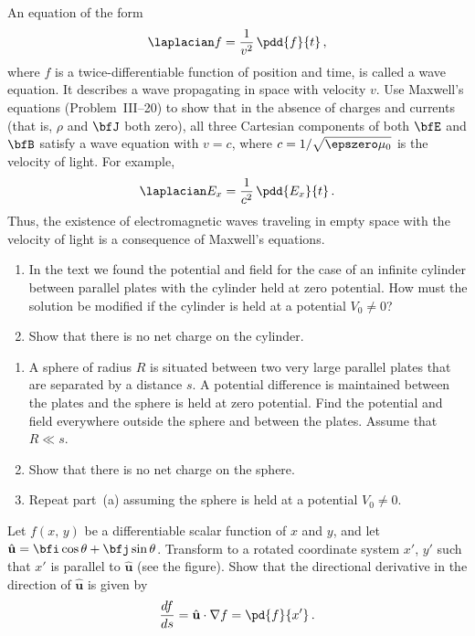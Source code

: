 \begin{problems}
\prob
An equation of the form
\[
\laplacian f = \frac{1}{v^2}\,\pdd{f}{t}\,,
\]
where $f$ is a twice-differentiable function of position and time, is
called a wave equation.  It describes a wave propagating in space
with velocity $v$.  Use Maxwell's equations (Problem~III--20) to
show that in the absence of charges and currents (that is, $\rho$ and
$\bfJ$ both zero), all three Cartesian components of both $\bfE$ and
$\bfB$ satisfy a wave equation with $v = c$, where
$c = 1/\sqrt{\epszero\mu_0}$ is the velocity of light.  For example,
\[
\laplacian E_x = \frac{1}{c^2}\,\pdd{E_x}{t}\,.
\]
Thus, the existence of electromagnetic waves traveling in empty
space with the velocity of light is a consequence of Maxwell's
equations.

\prob
\begin{enumerate}[label=(\alph*)]
\item In the text we found the potential and field for the case of an
  infinite cylinder between parallel plates with the cylinder held at
  zero potential.  How must the solution be modified if the cylinder is
  held at a potential $V_0 \neq 0$?

\item Show that there is no net charge on the cylinder.
\end{enumerate}

\prob
\begin{enumerate}[label=(\alph*)]
\item A sphere of radius $R$ is situated between two very large
  parallel plates that are separated by a distance $s$.  A potential
  difference is maintained between the plates and the sphere is held
  at zero potential.  Find the potential and field everywhere outside
  the sphere and between the plates.  Assume that $R \ll s$.

\item Show that there is no net charge on the sphere.

\item Repeat part~(a) assuming the sphere is held at a potential
  $V_0 \neq 0$.
\end{enumerate}

\prob
Let $f(x,\,y)$ be a differentiable scalar function of $x$ and $y$,
and let $\hat{\mathbf{u}} = \bfi\cos\theta + \bfj\sin\theta$.
Transform to a rotated coordinate system $x'$, $y'$ such that $x'$
is parallel to $\hat{\mathbf{u}}$ (see the figure).  Show that the
directional derivative in the direction of $\hat{\mathbf{u}}$ is given
by
\[
\frac{df}{ds} = \hat{\mathbf{u}}\cdot\nabla f = \pd{f}{x'}\,.
\]


\end{problems}

